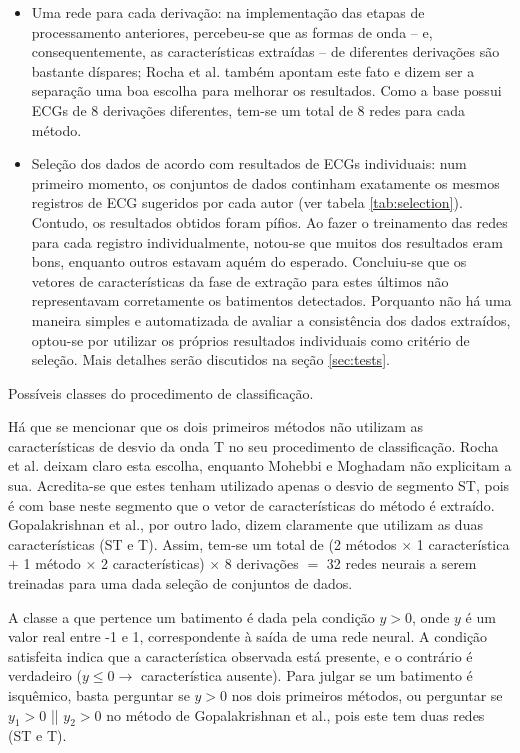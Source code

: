 \begin{itemize}
    \item Uma rede para cada derivação: na implementação das etapas de processamento anteriores, percebeu-se que as formas de onda -- e, consequentemente, as características extraídas -- de diferentes derivações são bastante díspares; Rocha et al. também apontam este fato e dizem ser a separação uma boa escolha para melhorar os resultados. Como a base possui ECGs de 8 derivações diferentes, tem-se um total de 8 redes para cada método.
    \item Seleção dos dados de acordo com resultados de ECGs individuais: num primeiro momento, os conjuntos de dados continham exatamente os mesmos registros de ECG sugeridos por cada autor (ver tabela \ref{tab:selection}). Contudo, os resultados obtidos foram pífios. Ao fazer o treinamento das redes para cada registro individualmente, notou-se que muitos dos resultados eram bons, enquanto outros estavam aquém do esperado. Concluiu-se que os vetores de características da fase de extração para estes últimos não representavam corretamente os batimentos detectados. Porquanto não há uma maneira simples e automatizada de avaliar a consistência dos dados extraídos, optou-se por utilizar os próprios resultados individuais como critério de seleção. Mais detalhes serão discutidos na seção \ref{sec:tests}.
\end{itemize}

\begin{table}[ht!]
    \centering
    
    \caption[Possíveis classes do procedimento de classificação]{Possíveis classes do procedimento de classificação.}
    \label{tab:nnclasses}
\end{table}

Há que se mencionar que os dois primeiros métodos não utilizam as características de desvio da onda T no seu procedimento de classificação. Rocha et al. deixam claro esta escolha, enquanto Mohebbi e Moghadam não explicitam a sua. Acredita-se que estes tenham utilizado apenas o desvio de segmento ST, pois é com base neste segmento que o vetor de características do método é extraído. Gopalakrishnan et al., por outro lado, dizem claramente que utilizam as duas características (ST e T). Assim, tem-se um total de (2 métodos $\times$ 1 característica $+$ 1 método $\times$ 2 características) $\times$ 8 derivações $=$ 32 redes neurais a serem treinadas para uma dada seleção de conjuntos de dados.

A classe a que pertence um batimento é dada pela condição $y>0$, onde $y$ é um valor real entre -1 e 1, correspondente à saída de uma rede neural. A condição satisfeita indica que a característica observada está presente, e o contrário é verdadeiro ($y\leq 0 \rightarrow$ característica ausente). Para julgar se um batimento é isquêmico, basta perguntar se $y>0$ nos dois primeiros métodos, ou perguntar se $y_1>0$ || $y_2>0$ no método de Gopalakrishnan et al., pois este tem duas redes (ST e T).

